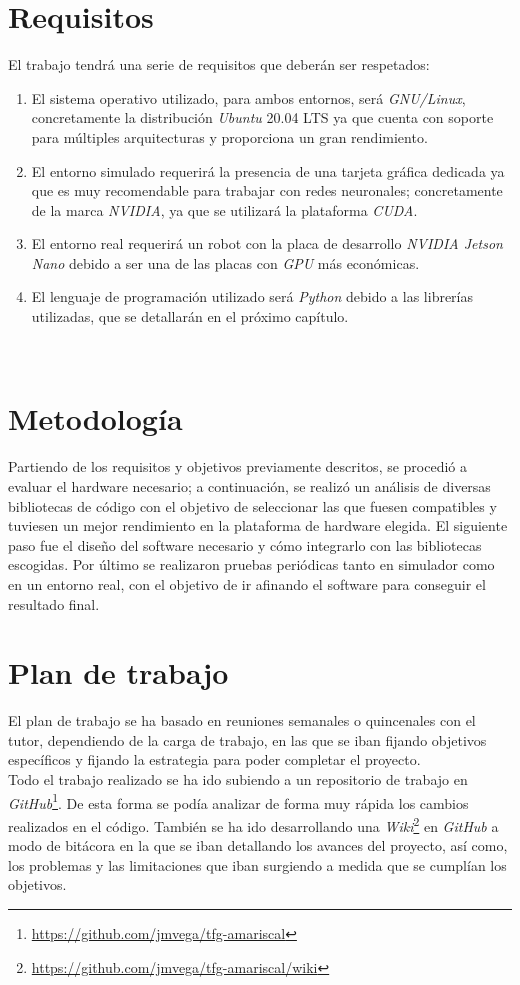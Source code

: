 \section{Requisitos}
\label{sec:requisitos}
El trabajo tendrá una serie de requisitos que deberán ser respetados:
\begin{enumerate}
	\item El sistema operativo utilizado, para ambos entornos, será \textit{GNU/Linux}, concretamente la distribución \textit{Ubuntu} 20.04 LTS ya que cuenta con soporte para múltiples arquitecturas y proporciona un gran rendimiento.
	\item El entorno simulado requerirá la presencia de una tarjeta gráfica dedicada ya que es muy recomendable para trabajar con redes neuronales; concretamente de la marca \textit{NVIDIA}, ya que se utilizará la plataforma \textit{CUDA}.
	\item El entorno real requerirá un robot con la placa de desarrollo \textit{NVIDIA Jetson Nano} debido a ser una de las placas con \textit{GPU} más económicas.
	\item El lenguaje de programación utilizado será \textit{Python} debido a las librerías utilizadas, que se detallarán en el próximo capítulo.
\end{enumerate}\

\section{Metodología}
\label{sec:metodologia}
Partiendo de los requisitos y objetivos previamente descritos, se procedió a evaluar el hardware necesario; a continuación, se realizó un análisis de diversas bibliotecas de código con el objetivo de seleccionar las que fuesen compatibles y tuviesen un mejor rendimiento en la plataforma de hardware elegida. El siguiente paso fue el diseño del software necesario y cómo integrarlo con las bibliotecas escogidas. Por último se realizaron pruebas periódicas tanto en simulador como en un entorno real, con el objetivo de ir afinando el software para conseguir el resultado final.\\

\section{Plan de trabajo}
\label{sec:plantrabajo}

El plan de trabajo se ha basado en reuniones semanales o quincenales con el tutor, dependiendo de la carga de trabajo, en las que se iban fijando objetivos específicos y fijando la estrategia para poder completar el proyecto.\\

Todo el trabajo realizado se ha ido subiendo a un repositorio de trabajo en \textit{GitHub}\footnote{\url{https://github.com/jmvega/tfg-amariscal}}. De esta forma se podía analizar de forma muy rápida los cambios realizados en el código. También se ha ido desarrollando una \textit{Wiki}\footnote{\url{https://github.com/jmvega/tfg-amariscal/wiki}} en \textit{GitHub} a modo de bitácora en la que se iban detallando los avances del proyecto, así como, los problemas y las limitaciones que iban surgiendo a medida que se cumplían los objetivos.\\
